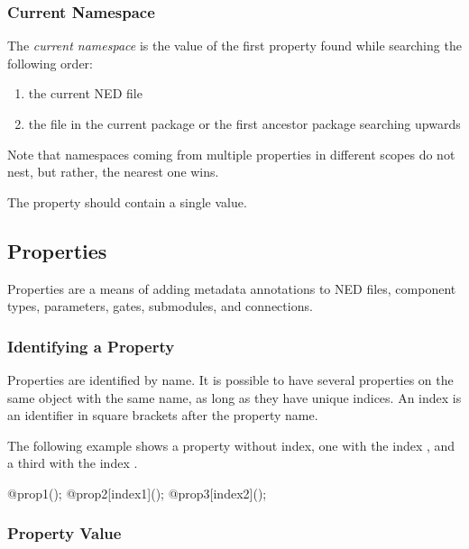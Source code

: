 \subsubsection{Current Namespace}
\label{ch:ned-ref:current-namespace}

The \textit{current namespace} is the value of the first 
property found while searching the following order:

\begin{enumerate}
  \item the current NED file
  \item the  file in the current package or the first ancestor
        package searching upwards
\end{enumerate}

\begin{note}
    Note that namespaces coming from multiple  properties
    in different scopes do not nest, but rather, the nearest one wins.
\end{note}

The  property should contain a single value.



\subsection{Properties}
\label{sec:ned-ref:properties}

Properties are a means of adding metadata annotations to NED files, component types,
parameters, gates, submodules, and connections.

\subsubsection{Identifying a Property}
\label{sec:ned-ref:identifying-a-property}

Properties are identified by name. It is possible to have several properties
on the same object with the same name, as long as they have unique indices.
An index is an identifier in square brackets after the property name.

The following example shows a property without index, one with the index ,
and a third with the index .

\begin{ned}
@prop1();
@prop2[index1]();
@prop3[index2]();
\end{ned}


\subsubsection{Property Value}
\label{sec:ned-ref:property-value}

